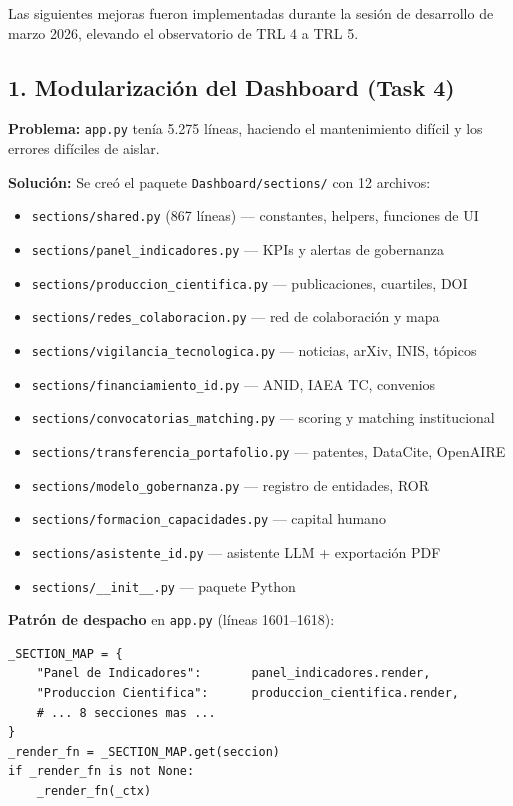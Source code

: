 \documentclass[12pt,a4paper]{report}
\begin{document}
Las siguientes mejoras fueron implementadas durante la sesión de desarrollo de marzo 2026,
elevando el observatorio de TRL 4 a TRL 5.

\subsection*{1. Modularización del Dashboard (Task 4)}

\textbf{Problema:} \texttt{app.py} tenía 5.275 líneas, haciendo el mantenimiento difícil
y los errores difíciles de aislar.

\textbf{Solución:} Se creó el paquete \texttt{Dashboard/sections/} con 12 archivos:

\begin{itemize}
  \item \texttt{sections/shared.py} (867 líneas) --- constantes, helpers, funciones de UI
  \item \texttt{sections/panel\_indicadores.py} --- KPIs y alertas de gobernanza
  \item \texttt{sections/produccion\_cientifica.py} --- publicaciones, cuartiles, DOI
  \item \texttt{sections/redes\_colaboracion.py} --- red de colaboración y mapa
  \item \texttt{sections/vigilancia\_tecnologica.py} --- noticias, arXiv, INIS, tópicos
  \item \texttt{sections/financiamiento\_id.py} --- ANID, IAEA TC, convenios
  \item \texttt{sections/convocatorias\_matching.py} --- scoring y matching institucional
  \item \texttt{sections/transferencia\_portafolio.py} --- patentes, DataCite, OpenAIRE
  \item \texttt{sections/modelo\_gobernanza.py} --- registro de entidades, ROR
  \item \texttt{sections/formacion\_capacidades.py} --- capital humano
  \item \texttt{sections/asistente\_id.py} --- asistente LLM + exportación PDF
  \item \texttt{sections/\_\_init\_\_.py} --- paquete Python
\end{itemize}

\textbf{Patrón de despacho} en \texttt{app.py} (líneas 1601--1618):
\begin{lstlisting}[style=pythonstyle]
_SECTION_MAP = {
    "Panel de Indicadores":       panel_indicadores.render,
    "Produccion Cientifica":      produccion_cientifica.render,
    # ... 8 secciones mas ...
}
_render_fn = _SECTION_MAP.get(seccion)
if _render_fn is not None:
    _render_fn(_ctx)
\end{lstlisting}
\end{document}
